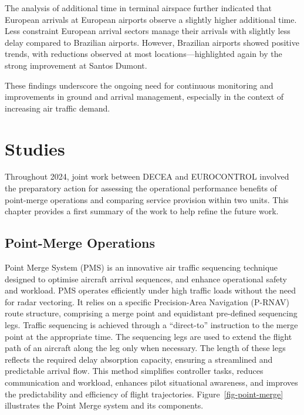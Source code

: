 \documentclass[
  a4paper,
  DIV=11,
  numbers=noendperiod]{scrreport}
\begin{document}
The analysis of additional time in terminal airspace further indicated
that European arrivals at European airports observe a slightly higher
additional time. Less constraint European arrival sectors manage their
arrivals with slightly less delay compared to Brazilian airports.
However, Brazilian airports showed positive trends, with reductions
observed at most locations---highlighted again by the strong improvement
at Santos Dumont.

These findings underscore the ongoing need for continuous monitoring and
improvements in ground and arrival management, especially in the context
of increasing air traffic demand.


\chapter{Studies}\label{studies}

Throughout 2024, joint work between DECEA and EUROCONTROL involved the
preparatory action for assessing the operational performance benefits of
point-merge operations and comparing service provision within two units.
This chapter provides a first summary of the work to help refine the
future work.

\section{Point-Merge Operations}\label{point-merge-operations}

Point Merge System (PMS) is an innovative air traffic sequencing
technique designed to optimise aircraft arrival sequences, and enhance
operational safety and workload. PMS operates efficiently under high
traffic loads without the need for radar vectoring. It relies on a
specific Precision-Area Navigation (P-RNAV) route structure, comprising
a merge point and equidistant pre-defined sequencing legs. Traffic
sequencing is achieved through a ``direct-to'' instruction to the merge
point at the appropriate time. The sequencing legs are used to extend
the flight path of an aircraft along the leg only when necessary. The
length of these legs reflects the required delay absorption capacity,
ensuring a streamlined and predictable arrival flow. This method
simplifies controller tasks, reduces communication and workload,
enhances pilot situational awareness, and improves the predictability
and efficiency of flight trajectories. Figure~\ref{fig-point-merge}
illustrates the Point Merge system and its components.
\end{document}
